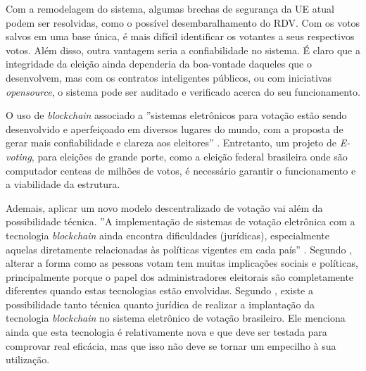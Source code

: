 \documentclass[portuguese]{textolivre}
\begin{document}
	
	
	Com a remodelagem do sistema, algumas brechas de segurança da UE atual podem ser resolvidas, como o possível desembaralhamento do RDV. Com os votos salvos em uma base única, é mais difícil identificar os votantes a seus respectivos votos. Além disso, outra vantagem seria a confiabilidade no sistema. É claro que a integridade da eleição ainda dependeria da boa-vontade daqueles que o desenvolvem, mas com os contratos inteligentes públicos, ou com iniciativas \emph{opensource}, o sistema pode ser auditado e verificado acerca do seu funcionamento.
	
	O uso de \emph{blockchain} associado a ''sistemas eletrônicos para votação estão sendo desenvolvido e aperfeiçoado em diversos lugares do mundo, com a proposta de gerar mais confiabilidade e clareza aos eleitores'' \cite{sepulvida2019estudo}. Entretanto, um projeto de \emph{E-voting}, para eleições de grande porte, como a eleição federal brasileira onde são computador centeas de milhões de votos, é necessário garantir o funcionamento e a viabilidade da estrutura. 
	
	Ademais, aplicar um novo modelo descentralizado de votação vai além da possibilidade técnica. ''A implementação de sistemas de votação eletrônica com a tecnologia \emph{blockchain} ainda encontra dificuldades (jurídicas), especialmente aquelas diretamente relacionadas às políticas vigentes em cada país'' \cite{sepulvida2019estudo}.  Segundo \textcite{gibson2016review}, alterar a forma como as pessoas votam tem muitas implicações sociais e políticas, principalmente porque o papel dos administradores eleitorais são completamente diferentes quando estas tecnologias estão envolvidas. Segundo \textcite{silvapassos2018}, existe a possibilidade tanto técnica quanto jurídica de realizar a implantação da tecnologia \emph{blockchain} no sistema eletrônico de votação brasileiro. Ele menciona ainda que esta tecnologia é relativamente nova e que deve ser testada para comprovar real eficácia, mas que isso não deve se tornar um empecilho à sua utilização. 
	
\end{document}

